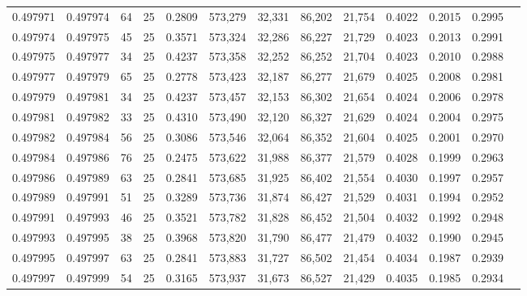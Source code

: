 \begin{tabular}{rrrrrrrrrrrrr}
0.497971 & 0.497974 &    64 &  25 &                                     0.2809 & 573,279 &  32,331 &  86,202 &  21,754 & 0.4022 & 0.2015 & 0.2995 \\
0.497974 & 0.497975 &    45 &  25 &                                     0.3571 & 573,324 &  32,286 &  86,227 &  21,729 & 0.4023 & 0.2013 & 0.2991 \\
0.497975 & 0.497977 &    34 &  25 &                                     0.4237 & 573,358 &  32,252 &  86,252 &  21,704 & 0.4023 & 0.2010 & 0.2988 \\
0.497977 & 0.497979 &    65 &  25 &                                     0.2778 & 573,423 &  32,187 &  86,277 &  21,679 & 0.4025 & 0.2008 & 0.2981 \\
0.497979 & 0.497981 &    34 &  25 &                                     0.4237 & 573,457 &  32,153 &  86,302 &  21,654 & 0.4024 & 0.2006 & 0.2978 \\
0.497981 & 0.497982 &    33 &  25 &                                     0.4310 & 573,490 &  32,120 &  86,327 &  21,629 & 0.4024 & 0.2004 & 0.2975 \\
0.497982 & 0.497984 &    56 &  25 &                                     0.3086 & 573,546 &  32,064 &  86,352 &  21,604 & 0.4025 & 0.2001 & 0.2970 \\
0.497984 & 0.497986 &    76 &  25 &                                     0.2475 & 573,622 &  31,988 &  86,377 &  21,579 & 0.4028 & 0.1999 & 0.2963 \\
0.497986 & 0.497989 &    63 &  25 &                                     0.2841 & 573,685 &  31,925 &  86,402 &  21,554 & 0.4030 & 0.1997 & 0.2957 \\
0.497989 & 0.497991 &    51 &  25 &                                     0.3289 & 573,736 &  31,874 &  86,427 &  21,529 & 0.4031 & 0.1994 & 0.2952 \\
0.497991 & 0.497993 &    46 &  25 &                                     0.3521 & 573,782 &  31,828 &  86,452 &  21,504 & 0.4032 & 0.1992 & 0.2948 \\
0.497993 & 0.497995 &    38 &  25 &                                     0.3968 & 573,820 &  31,790 &  86,477 &  21,479 & 0.4032 & 0.1990 & 0.2945 \\
0.497995 & 0.497997 &    63 &  25 &                                     0.2841 & 573,883 &  31,727 &  86,502 &  21,454 & 0.4034 & 0.1987 & 0.2939 \\
0.497997 & 0.497999 &    54 &  25 &                                     0.3165 & 573,937 &  31,673 &  86,527 &  21,429 & 0.4035 & 0.1985 & 0.2934 \\

\end{tabular}
